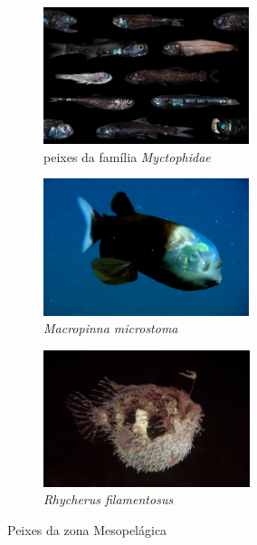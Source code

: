 \documentclass{report}
\begin{document}
\begin{figure}[H]
\center
    \begin{subfigure}{.5\textwidth}
    \center
        \includegraphics[height=4cm]{imagens/lanternfish.jpeg}
        \caption{peixes da família \textit{Myctophidae}}
        \label{fig:peixelanterna}
    \end{subfigure}%
    \hfill
    \begin{subfigure}{.5\textwidth}
    \center
        \includegraphics[height=4cm]{imagens/barreleye.jpeg}
        \caption{\textit{Macropinna microstoma}}
        \label{fig:barreleye}
    \end{subfigure}%
    \hfill
    \begin{subfigure}{.5\textwidth}
    \center    
        \includegraphics[height=4cm]{imagens/anglerfish.jpg}
        \caption{\textit{Rhycherus filamentosus}}
        \label{fig:tamboril}
    \end{subfigure}
    \caption{Peixes da zona Mesopelágica}
    \label{fig:peixesMeso}
\end{figure}
\end{document}
